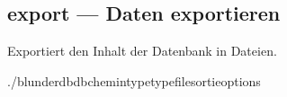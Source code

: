 \documentclass[letterpaper,10pt,german]{sphinxmanual}
\begin{document}
\subsection{export — Daten exportieren}
\label{\detokenize{cli:export-exporter-des-donnees}}
\sphinxAtStartPar
Exportiert den Inhalt der Datenbank in Dateien.

\begin{sphinxVerbatim}[commandchars=\\\{\}]
./blunderdb\PYGZhy{}\PYGZhy{}db\PYGZlt{}chemin\PYGZgt{}\PYGZhy{}\PYGZhy{}type\PYGZlt{}type\PYGZgt{}\PYGZhy{}\PYGZhy{}file\PYGZlt{}sortie\PYGZgt{}\PYG{o}{[}options\PYG{o}{]}
\end{sphinxVerbatim}

\sphinxAtStartPar
{}
\end{document}
